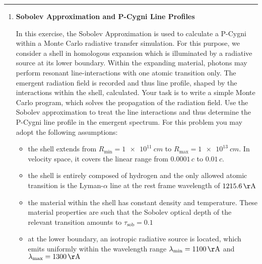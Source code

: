 \documentclass[12pt,a4paper,twoside]{article}
\begin{document}
\hrule

\begin{enumerate}
\item \textbf{Sobolev Approximation and P-Cygni Line Profiles}

  In this exercise, the Sobolev Approximation is used to calculate a P-Cygni
  within a Monte Carlo radiative transfer simulation. For this purpose, we
  consider a shell in homologous expansion which is illuminated by a radiative
  source at its lower boundary. Within the expanding material, photons may
  perform resonant line-interactions with one atomic transition only. The
  emergent radiation field is recorded and thus line profile, shaped by the
  interactions within the shell, calculated. Your task is to write a simple
  Monte Carlo program, which solves the propagation of the radiation field. Use
  the Sobolev approximation to treat the line interactions and thus determine
  the P-Cygni line profile in the emergent spectrum. For this problem you may
  adopt the following assumptions:

  \begin{itemize}
    \item the shell extends from $R_{\mathrm{min}} = \SI{1e11}{cm}$ to
      $R_{\mathrm{max}} = \SI{1e13}{cm}$. In velocity space, it covers the
      linear range from $0.0001\,c$ to $0.01 \,c$. 
    \item the shell is entirely composed of hydrogen and the only allowed atomic
      transition is the Lyman-$\alpha$ line at the rest frame wavelength of
      $1215.6\,\mathrm{\AA}$
    \item the material within the shell has constant density and temperature.
      These material properties are such that the Sobolev optical depth of the
      relevant transition amounts to $\tau_{\mathrm{sob}} = 0.1$
    \item at the lower boundary, an isotropic radiative source is located, which
      emits uniformly within the wavelength range $\lambda_{\mathrm{min}} = 1100
      \, \mathrm{\AA}$ and $\lambda_{\mathrm{max}} = 1300 \, \mathrm{\AA}$
  \end{itemize}


\end{enumerate}
\end{document}
